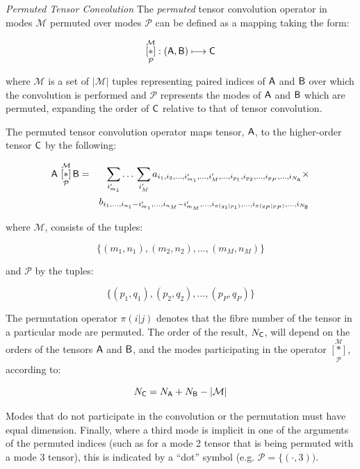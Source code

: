 \begin{definition}{\textit{Permuted Tensor Convolution}} \label{def:permconvop} The \textit{permuted} tensor convolution operator in modes $\mathcal{M}$ permuted over modes $\mathcal{P}$ can be defined as a mapping taking the form:

\begin{equation}
 \underset{\mathcal{P}}{\overset{\mathcal{M}}{[ \ast ]}}: \left (\mathsf{A},\mathsf{B}  \right ) \longmapsto \mathsf{C}
 \end{equation}
 
 where $\mathcal{M}$ is a set of $|\mathcal{M}|$ tuples representing paired indices of $\mathsf{A}$ and $\mathsf{B}$ over which the convolution is performed and $\mathcal{P}$ represents the modes of $\mathsf{A}$ and $\mathsf{B}$ which are permuted, expanding the order of $\mathsf{C}$ relative to that of tensor convolution.

The permuted tensor convolution operator maps tensor, $\mathsf{A}$, to the higher-order tensor $\mathsf{C}$ by the following:

\begin{eqnarray}
\mathsf{A}\,\,\underset{\mathcal{P}}{\overset{\mathcal{M}}{[ \ast ]}}\, {\mathsf{B}} &=& \sum_{i'_{m_1}}\ldots\,\sum_{i_{M}'}  a_{i_1,i_2,...,i_{m_1}',...,i_{M}',...,i_{p_1},i_{p_2},...,i_{p_P},...,i_{N_{\mathsf{A}}}} \times \nonumber \\
 & &b_{i_1,...,i_{n_1}-i_{m_1}',...,i_{n_M}-i_{m_M}',...,i_{\pi(q_1|p_1)},...,i_{\pi(q_P|p_P)},...,i_{N_{\mathsf{B}}}}
\label{eq:t2}
\end{eqnarray}

where $\mathcal{M}$, consists of the tuples:

\begin{equation}
\lbrace(m_1,n_1),(m_2,n_2),...,(m_{M},n_{M})\rbrace
\end{equation}

and $\mathcal{P}$ by the tuples:

\begin{equation}
\lbrace(p_1,q_1),(p_2,q_2),...,(p_{P},q_{P})\rbrace
\end{equation}

The permutation operator $\pi(i|j)$ denotes that the fibre number of the tensor in a particular mode are permuted.  The order of the result, $N_{\mathsf{C}}$, will depend on the orders of the tensors $\mathsf{A}$ and $\mathsf{B}$, and the modes participating in the operator $\underset{\mathcal{P}}{\overset{\mathcal{M}}{[ \ast ]}}$, according to:

\begin{equation}
N_{\mathsf{C}} = N_{\mathsf{A}} + N_{\mathsf{B}} - |\mathcal{M}| 
\end{equation}


Modes that do not participate in the convolution or the permutation must have equal dimension. Finally, where a third mode is implicit in one of the arguments of the permuted indices (such as for a mode 2 tensor that is being permuted with a mode 3 tensor), this is indicated by a ``dot'' symbol (e.g. $\mathcal{P} = \lbrace (\cdot,3))$.

\end{definition}



